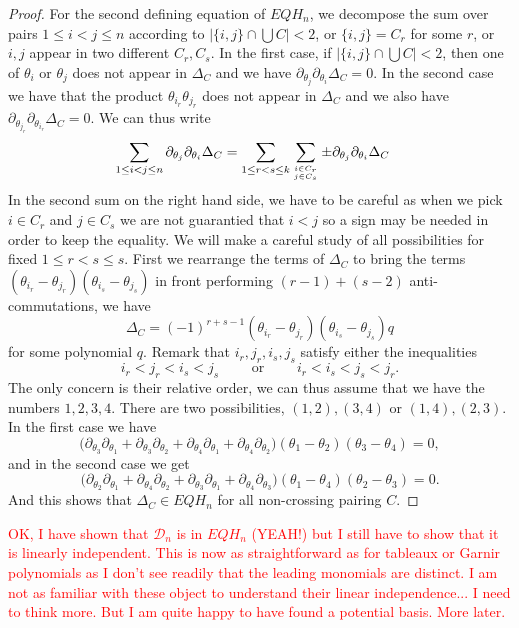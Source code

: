 \documentclass[11pt]{amsart}
\theoremstyle{definition}
\numberwithin{equation}{section}
\begin{document}
\begin{proof}
For the second defining equation of $EQH_n $, we decompose the sum over pairs $1\le i<j\le n$ according to $|\{i,j\}\cap \bigcup C|<2$, or $\{i,j\}=C_r$ for some $r$, or $i,j$ appear in two different $C_{r},C_{s}$. In the first case, if  $|\{i,j\}\cap \bigcup C|<2$, then one of $\theta_i$ or $\theta_j$ does not appear in $\Delta_C$ and we have $ \partial_{\theta_j} \partial_{\theta_i}\Delta_C=0$. In the second case we have that the product $\theta_{i_r}\theta_{j_r}$ does not appear in $\Delta_C$ and we also have $ \partial_{\theta_{j_r}} \partial_{\theta_{i_r}}\Delta_C=0$.
We can thus write
\begin{align*}
 \sum_{1\le i<j\le n} \partial_{\theta_j}\partial_{\theta_i}\Delta_C&= \sum_{1\le r<s\le k} \sum_{i\in C_{r} \atop j\in C_{s}} \pm  \partial_{\theta_j}\partial_{\theta_i}\Delta_C
\end{align*}
In the second sum on the right hand side, we have to be careful as when we pick $i\in C_{r}$ and $ j\in C_{s}$ we are not guarantied that $i<j$ so a sign may be needed 
in  order to keep the equality. We will make a careful study of all possibilities for fixed $1\le r<s\le s$. First we rearrange the terms of $\Delta_C$ to  bring the terms 
$(\theta_{i_{r}}-\theta_{j_{r}})(\theta_{i_{s}}-\theta_{j_{s}})$ in front  performing $(r-1)+(s-2)$ anti-commutations, we have 
  $$\Delta_C  =(-1)^{r+s-1}(\theta_{i_{r}}-\theta_{j_{r}})(\theta_{i_{s}}-\theta_{j_{s}})q$$
  for some polynomial $q$. Remark that $i_{r},j_{r},i_{s},j_{s}$ satisfy either the inequalities
  $$  i_r<j_r<i_s<j_s \qquad \text{ or }\qquad  i_r<i_s<j_s<j_r.$$
 The only concern is their relative order, we can thus assume that we have the numbers $1,2,3,4$.
  There are two possibilities, $(1,2),(3,4)$ or $(1,4),(2,3)$.
  In the first case we have
$$ \big( \partial_{\theta_3}\partial_{\theta_1} +  \partial_{\theta_3}\partial_{\theta_2} +  \partial_{\theta_4}\partial_{\theta_1} +  \partial_{\theta_4}\partial_{\theta_2}\big)
     (\theta_{1}-\theta_{2})(\theta_{3}-\theta_{4}) =0,
$$  
 and in the second case we get 
$$ \big( \partial_{\theta_2}\partial_{\theta_1} +  \partial_{\theta_4}\partial_{\theta_2} +  \partial_{\theta_3}\partial_{\theta_1} +  \partial_{\theta_4}\partial_{\theta_3}\big)
     (\theta_{1}-\theta_{4})(\theta_{2}-\theta_{3}) =0.
$$  
And this shows that $\Delta_C\in EQH_n $ for all non-crossing pairing $C$.
\end{proof}

\textcolor{red}{OK, I have shown that ${\mathcal D}_n$ is in $EQH_n $ (YEAH!) but I still have to show that it is linearly independent.
This is now as straightforward as for tableaux or Garnir polynomials as I don't see readily that the leading monomials are distinct.
I am not as familiar with these object to understand their linear independence... I need to think more. But I am quite happy to have found 
a potential basis. More later. 
 }
\end{document}
